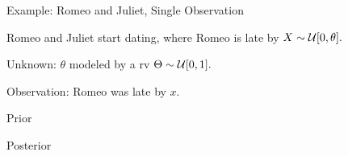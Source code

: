 \begin{frame}{Example: Romeo and Juliet, Single Observation}

\plitemsep 0.05in
\bci
\item<1-> Romeo and Juliet start dating, where 
Romeo is late by $X \sim \mathcal U[0,\theta].$
\item<2-> Unknown: $\theta$ modeled by a rv $\Theta \sim \mathcal U[0,1].$
\item<2-> Observation: Romeo was late by $x.$

\item<3-> Prior 
  
\item<5-> Posterior
  \eci

\end{frame}

